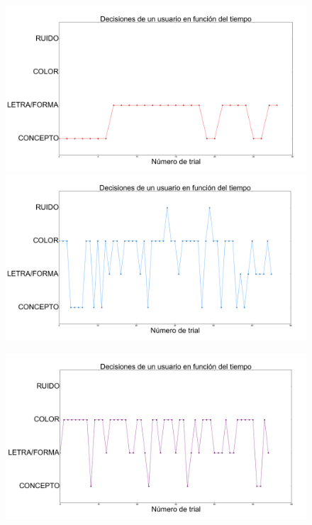 \documentclass{beamer}
\begin{document}
\begin{frame}
\begin{figure}[h]
\begin{minipage}[c]{1\textwidth}
  \end{minipage}
\end{figure}
\end{frame}

\begin{frame}
\begin{figure}[h]
 \centering
  \begin{minipage}[c]{1\textwidth}
	\includegraphics[scale=0.108]{user1.png}
	\includegraphics[scale=0.108]{user14.png}
  \end{minipage}
  \begin{minipage}[c]{1\textwidth}
	\includegraphics[scale=0.108]{user6.png}

\end{minipage}
\end{figure}
\end{frame}
\end{document}
